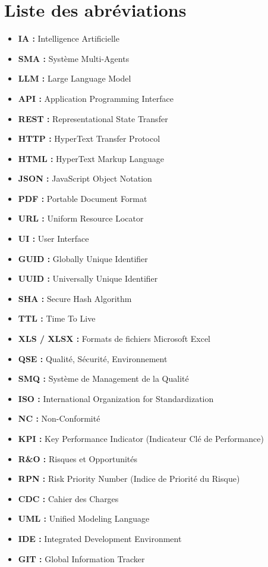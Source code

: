 \chapter*{Liste des abréviations}

\begin{itemize}

    \item \textbf{IA : }Intelligence Artificielle
    \item \textbf{SMA : }Système Multi-Agents
    \item \textbf{LLM : }Large Language Model
    \item \textbf{API : }Application Programming Interface
    \item \textbf{REST : }Representational State Transfer
    \item \textbf{HTTP : }HyperText Transfer Protocol
    \item \textbf{HTML : }HyperText Markup Language
    \item \textbf{JSON : }JavaScript Object Notation
    \item \textbf{PDF : }Portable Document Format
    \item \textbf{URL : }Uniform Resource Locator
    \item \textbf{UI : }User Interface
    \item \textbf{GUID : }Globally Unique Identifier
    \item \textbf{UUID : }Universally Unique Identifier
    \item \textbf{SHA : }Secure Hash Algorithm
    \item \textbf{TTL : }Time To Live
    \item \textbf{XLS / XLSX : }Formats de fichiers Microsoft Excel
    \item \textbf{QSE : }Qualité, Sécurité, Environnement
    \item \textbf{SMQ : }Système de Management de la Qualité
    \item \textbf{ISO : }International Organization for Standardization
    \item \textbf{NC : }Non-Conformité
    \item \textbf{KPI : }Key Performance Indicator (Indicateur Clé de Performance)
    \item \textbf{R\&O : }Risques et Opportunités
    \item \textbf{RPN : }Risk Priority Number (Indice de Priorité du Risque)
    \item \textbf{CDC : }Cahier des Charges
    \item \textbf{UML : }Unified Modeling Language
    \item \textbf{IDE : }Integrated Development Environment
    \item \textbf{GIT : }Global Information Tracker

\end{itemize}
